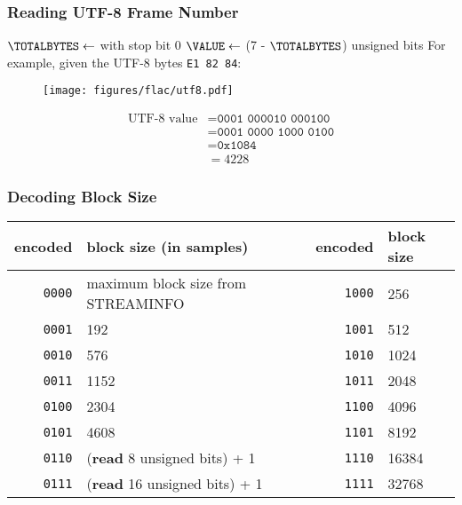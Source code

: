 \subsubsection{Reading UTF-8 Frame Number}
{
$\TOTALBYTES \leftarrow$ \UNARY with stop bit 0\;
$\VALUE \leftarrow$ \READ (7 - $\TOTALBYTES$) unsigned bits\;
\Return \VALUE\;
\EALGORITHM
}
For example, given the UTF-8 bytes \texttt{E1 82 84}:
\par
\begin{wrapfigure}[5]{l}{2.375in}
\texttt{[image: figures/flac/utf8.pdf]}
\end{wrapfigure}
\begin{align*}
\text{UTF-8 value} &= \texttt{0001 000010 000100} \\
&= \texttt{0001 0000 1000 0100} \\
&= \texttt{0x1084} \\
&= 4228
\end{align*}

\clearpage

\subsubsection{Decoding Block Size}
{
\begin{tabular}{rl||rl}
encoded & block size (in samples) &
encoded & block size \\
\hline
\texttt{0000} & maximum block size from STREAMINFO &
\texttt{1000} & 256 \\
\texttt{0001} & 192 &
\texttt{1001} & 512 \\
\texttt{0010} & 576 &
\texttt{1010} & 1024 \\
\texttt{0011} & 1152 &
\texttt{1011} & 2048 \\
\texttt{0100} & 2304 &
\texttt{1100} & 4096 \\
\texttt{0101} & 4608 &
\texttt{1101} & 8192 \\
\texttt{0110} & (\textbf{read} 8 unsigned bits) + 1 &
\texttt{1110} & 16384 \\
\texttt{0111} & (\textbf{read} 16 unsigned bits) + 1 &
\texttt{1111} & 32768 \\
\end{tabular}
}

